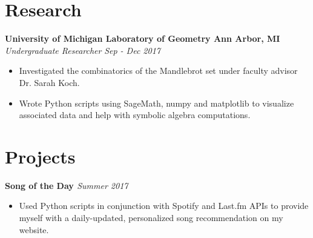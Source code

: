\documentclass[margin,line]{resume}
\begin{document}
\begin{resume}
	
	\sectionbreak
	\vspace{-2.5mm}
	\section{\mysidestyle Research}
	\textbf{University of Michigan Laboratory of Geometry \hfill Ann Arbor, MI} \\\vspace{1mm}%
	\textsl{Undergraduate Researcher} \hfill \textsl{Sep - Dec 2017}
	\begin{itemize}[leftmargin=4mm]
		\item Investigated the combinatorics of the Mandlebrot set under faculty advisor Dr. Sarah Koch.
		\item Wrote Python scripts using SageMath, numpy and matplotlib to visualize associated data and help with symbolic algebra computations. 
	\end{itemize}
	\vspace{1.5mm}
	
	\sectionbreak
	\vspace{-2.5mm}
	\section{\mysidestyle Projects}
	\textbf{Song of the Day \href{https://github.com/jonathoma/songoftheday}{\faGithub}}  \hfill \textsl{Summer 2017} \vspace{1mm}%
	\begin{itemize}[leftmargin=4mm]
		\item Used Python scripts in conjunction with Spotify and Last.fm APIs to provide myself with a daily-updated, personalized song recommendation on my website.
	\end{itemize}
	\vspace{1.5mm}
	   

\end{resume}
\end{document}
